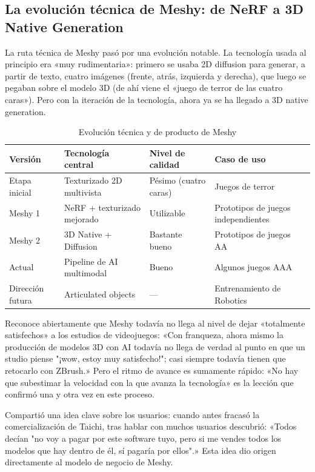 \documentclass[a4paper]{article}
\begin{document}
\subsection{La evolución técnica de Meshy: de NeRF a 3D Native Generation}

La ruta técnica de Meshy pasó por una evolución notable. La tecnología usada al principio era «muy rudimentaria»: primero se usaba 2D diffusion para generar, a partir de texto, cuatro imágenes (frente, atrás, izquierda y derecha), que luego se pegaban sobre el modelo 3D (de ahí viene el «juego de terror de las cuatro caras»). Pero con la iteración de la tecnología, ahora ya se ha llegado a 3D native generation.

\begin{table}[H]
\centering
\caption{Evolución técnica y de producto de Meshy}
\begin{tabular}{llll}
\toprule
\textbf{Versión} & \textbf{Tecnología central} & \textbf{Nivel de calidad} & \textbf{Caso de uso} \\
\midrule
Etapa inicial & Texturizado 2D multivista & Pésimo (cuatro caras) & Juegos de terror \\
Meshy 1 & NeRF + texturizado mejorado & Utilizable & Prototipos de juegos independientes \\
Meshy 2 & 3D Native + Diffusion & Bastante bueno & Prototipos de juegos AA \\
Actual & Pipeline de AI multimodal & Bueno & Algunos juegos AAA \\
Dirección futura & Articulated objects & --- & Entrenamiento de Robotics \\
\bottomrule
\end{tabular}
\end{table}

Reconoce abiertamente que Meshy todavía no llega al nivel de dejar «totalmente satisfechos» a los estudios de videojuegos: «Con franqueza, ahora mismo la producción de modelos 3D con AI todavía no llega de verdad al punto en que un studio piense "¡wow, estoy muy satisfecho!"; casi siempre todavía tienen que retocarlo con ZBrush.» Pero el ritmo de avance es sumamente rápido: «No hay que subestimar la velocidad con la que avanza la tecnología» es la lección que confirmó una y otra vez en este proceso.

Compartió una idea clave sobre los usuarios: cuando antes fracasó la comercialización de Taichi, tras hablar con muchos usuarios descubrió: «Todos decían "no voy a pagar por este software tuyo, pero si me vendes todos los modelos que hay dentro de él, sí pagaría por ellos".» Esta idea dio origen directamente al modelo de negocio de Meshy.
\end{document}
